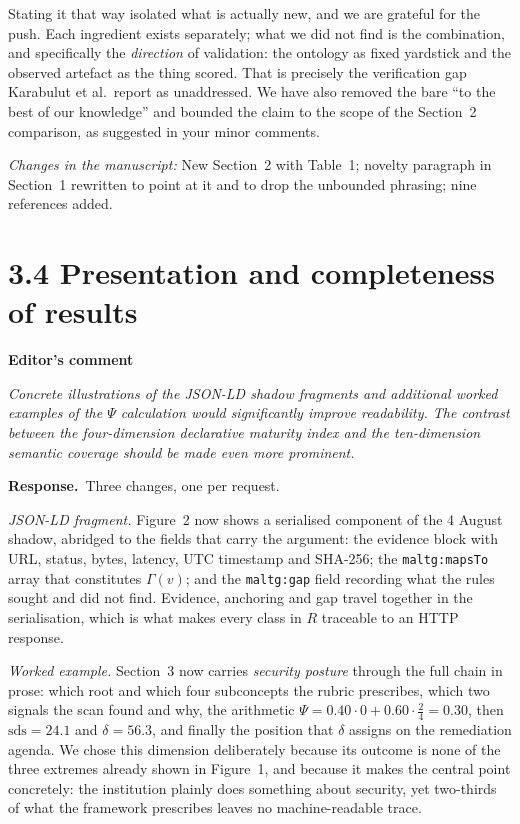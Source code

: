 \documentclass[11pt,a4paper]{article}
\newenvironment{comment}[1]
  {\par\vspace{6pt}\noindent\textbf{#1}\par\vspace{2pt}%
   \begin{mdframed}[backgroundcolor=cmtbg, linecolor=cmtrule, linewidth=0.6pt,
     innertopmargin=5pt, innerbottommargin=5pt, innerleftmargin=7pt,
     innerrightmargin=7pt, skipabove=2pt, skipbelow=5pt]\itshape}
  {\end{mdframed}}
\newcommand{\respuesta}{\par\noindent\textbf{Response.}\ }
\newcommand{\changed}[1]{\par\vspace{3pt}\noindent\textit{Changes in the manuscript:} #1\par}
\begin{document}
Stating it that way isolated what is actually new, and we are grateful for the push. Each ingredient exists separately; what we did not find is the combination, and specifically the \emph{direction} of validation: the ontology as fixed yardstick and the observed artefact as the thing scored. That is precisely the verification gap Karabulut et al.\ report as unaddressed. We have also removed the bare ``to the best of our knowledge'' and bounded the claim to the scope of the Section~2 comparison, as suggested in your minor comments.

\changed{New Section~2 with Table~1; novelty paragraph in Section~1 rewritten to point at it and to drop the unbounded phrasing; nine references added.}

\section*{3.4 Presentation and completeness of results}

\begin{comment}{Editor's comment}
Concrete illustrations of the JSON-LD shadow fragments and additional worked examples of the $\Psi$ calculation would significantly improve readability. The contrast between the four-dimension declarative maturity index and the ten-dimension semantic coverage should be made even more prominent.
\end{comment}

\respuesta Three changes, one per request.

\emph{JSON-LD fragment.} Figure~2 now shows a serialised component of the 4 August shadow, abridged to the fields that carry the argument: the evidence block with URL, status, bytes, latency, UTC timestamp and SHA-256; the \texttt{maltg:mapsTo} array that constitutes $\Gamma(v)$; and the \texttt{maltg:gap} field recording what the rules sought and did not find. Evidence, anchoring and gap travel together in the serialisation, which is what makes every class in $R$ traceable to an HTTP response.

\emph{Worked example.} Section~3 now carries \emph{security posture} through the full chain in prose: which root and which four subconcepts the rubric prescribes, which two signals the scan found and why, the arithmetic $\Psi=0.40\cdot 0+0.60\cdot\tfrac{2}{4}=0.30$, then $\mathrm{sds}=24.1$ and $\delta=56.3$, and finally the position that $\delta$ assigns on the remediation agenda. We chose this dimension deliberately because its outcome is none of the three extremes already shown in Figure~1, and because it makes the central point concretely: the institution plainly does something about security, yet two-thirds of what the framework prescribes leaves no machine-readable trace.
\end{document}
